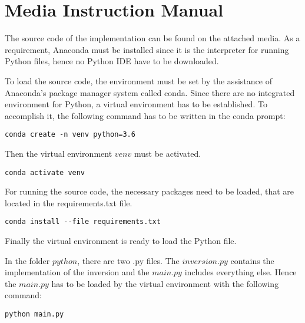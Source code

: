 \chapter*{Media Instruction Manual}

The source code of the implementation can be found on the attached media. As a requirement, Anaconda must be installed since it is the interpreter for running Python files, hence no Python IDE have to be downloaded. \smallskip

To load the source code, the environment must be set by the assistance of Anaconda's package manager system called conda. Since there are no integrated environment for Python, a virtual environment has to be established. To accomplish it, the following command has to be written in the conda prompt: 
\begin{lstlisting}
conda create -n venv python=3.6
\end{lstlisting}
Then the virtual environment $venv$ must be activated.
\begin{lstlisting}
conda activate venv
\end{lstlisting}
For running the source code, the necessary packages need to be loaded, that are located in the requirements.txt file.
\begin{lstlisting}
conda install --file requirements.txt
\end{lstlisting}
Finally the virtual environment is ready to load the Python file.\smallskip

In the folder $python$, there are two .py files. The $inversion.py$ contains the implementation of the inversion and the $main.py$ includes everything else. Hence the $main.py$ has to be loaded by the virtual environment with the following command: 
\begin{lstlisting}
python main.py
\end{lstlisting}
